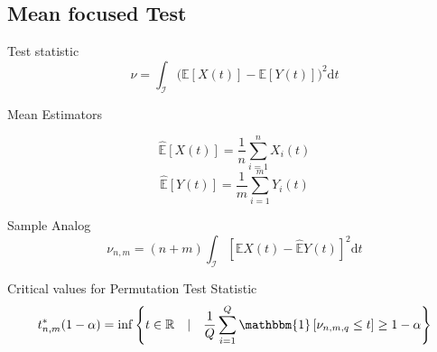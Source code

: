 \documentclass[12pt, a4paper]{article}
\theoremstyle{MAstyle} \newtheorem{assumption}{Assumption}[section]
\theoremstyle{MAstyle} \newtheorem{definition}{Definition}[section]
\theoremstyle{MAstyle} \newtheorem{theorem}{Theorem}[section]
\begin{document}
		\subsection{Mean focused Test}
			
			Test statistic
			\begin{equation}
				\nu = \int_{\mathcal{I}} \big(\mathbb{E}\left[X(t)\right] - \mathbb{E}\left[Y(t)\right]\big)^2 \mathrm{d}t
			\end{equation}
		
			Mean Estimators
			\begin{multicols}{2}
				\noindent
				\begin{equation*}
					\hat{\mathbb{E}}\left[X(t)\right] = \frac{1}{n}\sum_{i = 1}^{n} X_i(t)
				\end{equation*}
				\begin{equation}
					\hat{\mathbb{E}}\left[Y(t)\right] = \frac{1}{m}\sum_{i = 1}^{m} Y_i(t)
				\end{equation}
			\end{multicols}
		
			Sample Analog
			\begin{equation}
				\nu_{n,m} = (n+m) \int_{\mathcal{I}} \left[\hat{\mathbb{E}}X(t) - \hat{\mathbb{E}}Y(t)\right]^2 \mathrm{d}t
			\end{equation}
		
			Critical values for Permutation Test Statistic
			\begin{equation}
				t^{*}_{n,m}(1-\alpha) = \inf \left\{t \in \mathbb{R} \quad \vert \quad \frac{1}{Q} \sum_{i = 1}^{Q} \mathbbm{1}\left[\nu_{n,m,q} \leq t\right] \geq 1 - \alpha \right\}
			\end{equation}
		
\end{document}
